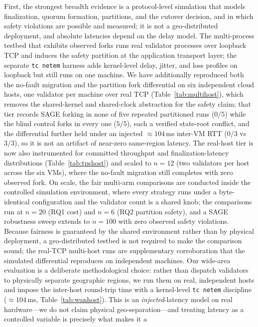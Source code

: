 \documentclass[journal]{IEEEtran}
\theoremstyle{definition}
\theoremstyle{remark}
\begin{document}
First, the strongest breadth evidence is a protocol-level simulation that models finalization,
quorum formation, partitions, and the cutover decision, and in which safety violations are
possible and measured; it is not a geo-distributed deployment, and absolute latencies depend on
the delay model. The multi-process testbed that exhibits observed forks runs real validator
processes over loopback TCP and induces the safety partition at the application transport layer;
the separate \texttt{tc netem} harness adds kernel-level delay, jitter, and loss profiles on
loopback but still runs on one machine. We have additionally reproduced both the no-fault
migration and the partition fork differential on six independent cloud hosts, one validator per
machine over real TCP (Table~\ref{tab:multihost}), which removes the shared-kernel and
shared-clock abstraction for the safety claim; that tier records SAGE forking in none of five
repeated partitioned runs ($0/5$) while the blind control forks in every one ($5/5$), each a
verified state-root conflict, and the differential further held under an injected $\approx 104$\,ms
inter-VM RTT ($0/3$ vs $3/3$), so it is not an artifact of near-zero same-region latency. The
real-host tier is now also instrumented for committed throughput and finalization-latency
distributions (Table~\ref{tab:tpshost}) and scaled to $n{=}12$ (two validators per host across the
six VMs), where the no-fault migration still completes with zero observed fork. On scale, the fair
multi-arm comparisons are conducted inside the controlled simulation environment, where every
strategy runs under a byte-identical configuration and the validator count is a shared knob; the
comparisons run at $n{=}20$ (RQ1 cost) and $n{=}6$ (RQ2 partition safety), and a SAGE robustness
sweep extends to $n{=}100$ with zero observed safety violations. Because fairness is guaranteed by
the shared environment rather than by physical deployment, a geo-distributed testbed is not
required to make the comparison sound; the real-TCP multi-host runs are supplementary corroboration
that the simulated differential reproduces on independent machines. Our wide-area evaluation is
a deliberate methodological choice: rather than dispatch validators to physically separate
geographic regions, we run them on real, independent hosts and impose the inter-host round-trip
time with a kernel-level \texttt{tc netem} discipline (${\approx}104$\,ms, Table~\ref{tab:wanhost}).
This is an \emph{injected}-latency model on real hardware---we do not claim physical
geo-separation---and treating latency as a controlled variable is precisely what makes it a
\end{document}

